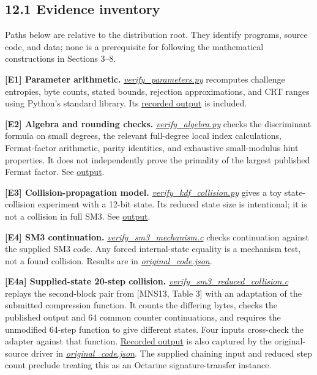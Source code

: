 \documentclass[
  american,
  10pt,
  a4paper,
]{article}
\newcounter{none} %
\begin{document}
\subsection{12.1 Evidence inventory}\label{evidence-inventory}

Paths below are relative to the distribution root. They identify
programs, source code, and data; none is a prerequisite for following
the mathematical constructions in Sections 3--8.

\textbf{{[}E1{]} Parameter arithmetic.}
\href{code/verify_parameters.py}{\emph{verify\_parameters.py}}
recomputes challenge entropies, byte counts, stated bounds, rejection
approximations, and CRT ranges using Python's standard library. Its
\href{evidence/verify_parameters.json}{recorded output} is included.

\textbf{{[}E2{]} Algebra and rounding checks.}
\href{code/verify_algebra.py}{\emph{verify\_algebra.py}} checks the
discriminant formula on small degrees, the relevant full-degree local
index calculations, Fermat-factor arithmetic, parity identities, and
exhaustive small-modulus hint properties. It does not independently
prove the primality of the largest published Fermat factor. See
\href{evidence/verify_algebra.json}{output}.

\textbf{{[}E3{]} Collision-propagation model.}
\href{code/verify_kdf_collision.py}{\emph{verify\_kdf\_collision.py}}
gives a toy state-collision experiment with a 12-bit state. Its reduced
state size is intentional; it is not a collision in full SM3. See
\href{evidence/verify_kdf_collision.txt}{output}.

\textbf{{[}E4{]} SM3 continuation.}
\href{code/verify_sm3_mechanism.c}{\emph{verify\_sm3\_mechanism.c}}
checks continuation against the supplied SM3 code. Any forced
internal-state equality is a mechanism test, not a found collision.
Results are in
\href{evidence/original_code.json}{\emph{original\_code.json}}.

\textbf{{[}E4a{]} Supplied-state 20-step collision.}
\href{code/verify_sm3_reduced_collision.c}{\emph{verify\_sm3\_reduced\_collision.c}}
replays the second-block pair from {[}MNS13, Table 3{]} with an
adaptation of the submitted compression function. It counts the
differing bytes, checks the published output and 64 common counter
continuations, and requires the unmodified 64-step function to give
different states. Four inputs cross-check the adapter against that
function. \href{evidence/verify_sm3_reduced_collision.txt}{Recorded
output} is also captured by the original-source driver in
\href{evidence/original_code.json}{\emph{original\_code.json}}. The
supplied chaining input and reduced step count preclude treating this as
an Octarine signature-transfer instance.
\end{document}
